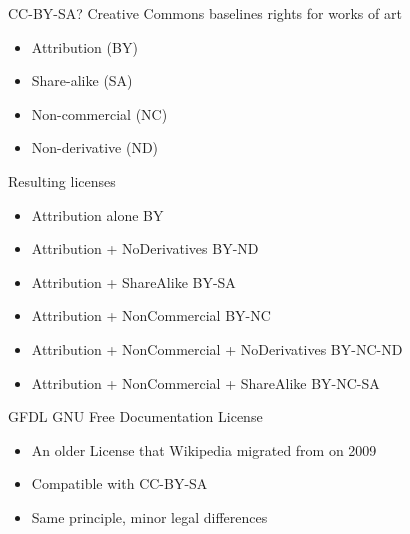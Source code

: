 \documentclass{beamer}
\begin{document}
\begin{frame}{CC-BY-SA?}
	Creative Commons baselines rights for works of art
	\begin{itemize}
		\item Attribution     (BY)
		\item Share-alike	(SA)
		\item Non-commercial	(NC)
		\item Non-derivative	(ND)
	\end{itemize}
	\pause Resulting licenses
	\begin{itemize}
		\item Attribution alone	BY
		\item Attribution + NoDerivatives	BY-ND
		\item Attribution + ShareAlike		BY-SA
		\item Attribution + NonCommercial	BY-NC
		\item Attribution + NonCommercial + NoDerivatives	BY-NC-ND
		\item Attribution + NonCommercial + ShareAlike		BY-NC-SA
	\end{itemize}
\end{frame}
\begin{frame}{GFDL}
	GNU Free Documentation License
	\begin{itemize}
		\pause \item An older License that Wikipedia migrated from on 2009
		\pause \item Compatible with CC-BY-SA
		\pause \item Same principle, minor legal differences
	\end{itemize}
\end{frame}
\end{document}
